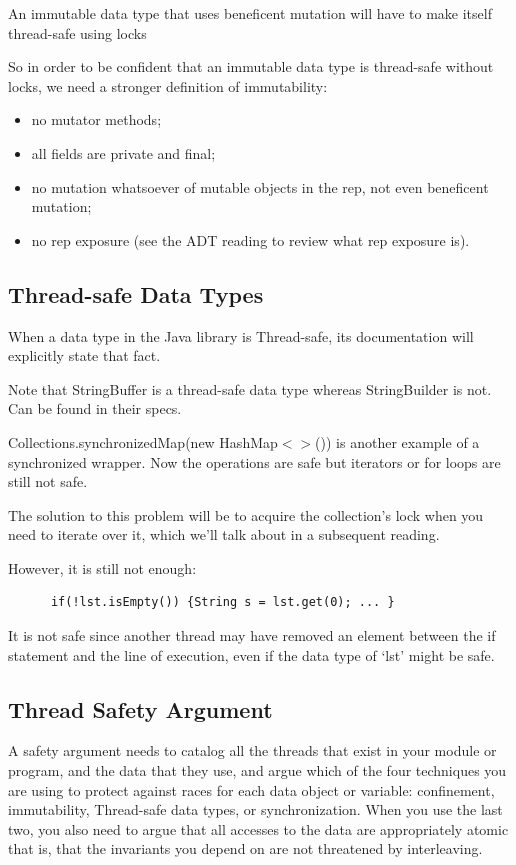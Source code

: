 \documentclass[letterpaper,12pt]{article}
\begin{document}
An immutable data type that uses beneficent mutation will have to make itself thread-safe using locks 

So in order to be confident that an immutable data type is thread-safe without locks, we need a stronger definition of immutability:\begin{itemize}
      \item no mutator methods;
      \item all fields are private and final;
      \item no mutation whatsoever of mutable objects in the rep, not even beneficent mutation;
      \item no rep exposure (see the ADT reading to review what rep exposure is).
\end{itemize}
\subsection{Thread-safe Data Types}
When a data type in the Java library is Thread-safe, its documentation will explicitly state that fact. 

Note that StringBuffer is a thread-safe data type whereas StringBuilder is not. Can be found in their specs. 

Collections.synchronizedMap(new HashMap$<>$()) is another example of a synchronized wrapper. Now the operations are safe but iterators or for loops are still not safe. 

The solution to this problem will be to acquire the collection's lock when you need to iterate over it, which we'll talk about in a subsequent reading.

However, it is still not enough:\begin{lstlisting}
      if(!lst.isEmpty()) {String s = lst.get(0); ... }
\end{lstlisting}
It is not safe since another thread may have removed an element between the if statement and the line of execution, even if the data type of `lst' might be safe. 

\subsection{Thread Safety Argument}
A safety argument needs to catalog all the threads that exist in your module or program, and the data that they use, and argue which of the four techniques you are using to protect against races for each data object or variable: confinement, immutability, Thread-safe data types, or synchronization. When you use the last two, you also need to argue that all accesses to the data are appropriately atomic that is, that the invariants you depend on are not threatened by interleaving. 
\end{document}
